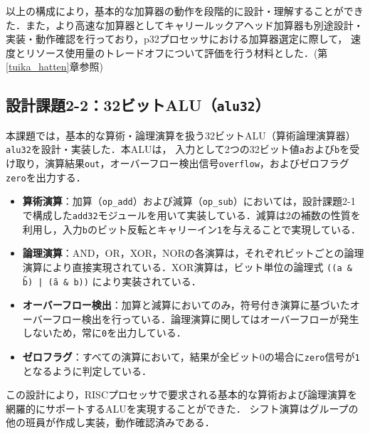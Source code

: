\documentclass[autodetect-engine,dvi=dvipdfmx,ja=standard,
               a4j,11pt]{bxjsarticle}
\begin{document}
以上の構成により，基本的な加算器の動作を段階的に設計・理解することができた．また，より高速な加算器としてキャリールックアヘッド加算器も別途設計・実装・動作確認を行っており，p32プロセッサにおける加算器選定に際して，
速度とリソース使用量のトレードオフについて評価を行う材料とした．(第\ref{tuika_hatten}章参照)

\subsection{設計課題2-2：32ビットALU（\texttt{alu32}）}

本課題では，基本的な算術・論理演算を扱う32ビットALU（算術論理演算器）\texttt{alu32}を設計・実装した．本ALUは，
入力として2つの32ビット値\texttt{a}および\texttt{b}を受け取り，演算結果\texttt{out}，オーバーフロー検出信号\texttt{overflow}，およびゼロフラグ\texttt{zero}を出力する．

\begin{itemize}
  \item \textbf{算術演算}：加算（\texttt{op\_add}）および減算（\texttt{op\_sub}）においては，設計課題2-1で構成した\texttt{add32}モジュールを用いて実装している．減算は2の補数の性質を利用し，入力\texttt{b}のビット反転とキャリーイン\texttt{1}を与えることで実現している．
  \item \textbf{論理演算}：AND，OR，XOR，NORの各演算は，それぞれビットごとの論理演算により直接実現されている．XOR演算は，ビット単位の論理式 \texttt{((a \& \~b) | (\~a \& b))} により実装されている．
  \item \textbf{オーバーフロー検出}：加算と減算においてのみ，符号付き演算に基づいたオーバーフロー検出を行っている．論理演算に関してはオーバーフローが発生しないため，常に\texttt{0}を出力している．
  \item \textbf{ゼロフラグ}：すべての演算において，結果が全ビット0の場合に\texttt{zero}信号が\texttt{1}となるように判定している．
\end{itemize}

この設計により，RISCプロセッサで要求される基本的な算術および論理演算を網羅的にサポートするALUを実現することができた．
シフト演算はグループの他の班員が作成し実装，動作確認済みである．
\end{document}
